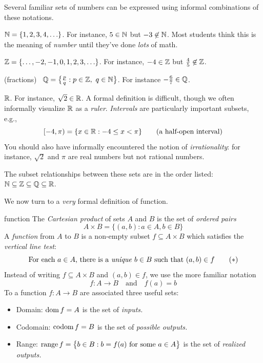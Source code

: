 Several familiar sets of numbers can be expressed using informal combinations of these notations.
\begin{description}\itemsep0pt
	\item[Natural numbers] $\mathbb{N}=\{1,2,3,4,\ldots\}$. For instance, $5\in\mathbb{N}$ but $-3\not\in\mathbb{N}$. Most students think this is the meaning of \emph{number} until they've done \emph{lots} of math.
	\item[Integers] $\mathbb{Z}=\{\ldots,-2,-1,0,1,2,3,\ldots\}$. For instance, $-4\in\mathbb{Z}$ but $\frac 45\not\in\mathbb{Z}$.
	\item[Rational numbers] (fractions) \ $\Q=\bigl\{\frac pq:p\in\Z,\ q\in\N\bigr\}$. For instance $-\frac 67\in\mathbb{Q}$. %
	\item[Real numbers] $\mathbb{R}$. For instance, $\sqrt 2\in\mathbb{R}$. A formal definition is difficult, though we often informally visualize $\mathbb{R}$ as a \emph{ruler}. \emph{Intervals} are particularly important subsets, e.g.,
	\[
		[-4,\pi)=\{x\in\mathbb{R}:-4\le x<\pi\} \tag{a half-open interval}
	\]
	You should also have informally encountered the notion of \emph{irrationality}: for instance, $\sqrt 2$ and $\pi$ are real numbers but not rational numbers.
\end{description}
The subset relationships between these sets are in the order listed: $\mathbb{N}\subseteq\mathbb{Z}\subseteq\mathbb{Q}\subseteq\mathbb{R}$.
\bigbreak

We now turn to a \emph{very} formal definition of function.

\begin{defn}{}{function}
	The \emph{Cartesian product} of sets $A$ and $B$ is the set of \emph{ordered pairs}
	\[
		A\times B=\big\{(a,b):a\in A,b\in B\big\}
	\]
	A \emph{function} from $A$ to $B$ is a non-empty subset $f\subseteq A\times B$ which satisfies the \emph{vertical line test}:
	\[
		\text{For each $a\in A$, there is a \emph{unique} $b\in B$ such that $(a,b)\in f$} \tag{$\ast$}
	\]
	Instead of writing $f\subseteq A\times B$ and $(a,b)\in f$, we use the more familiar notation
	\[
		f:A\to B\quad\text{and}\quad f(a)=b
	\]
	To a function $f:A\to B$ are associated three useful sets:
	\begin{itemize}
	  \item Domain: $\operatorname{dom} f=A$ is the set of \emph{inputs.}
	  \item Codomain: $\operatorname{codom} f=B$ is the set of \emph{possible outputs.}
	  \item Range: $\operatorname{range} f=\big\{b\in B:b=f(a)\text{ for some }a\in A\big\}$ is the set of \emph{realized outputs.}
	\end{itemize}
\end{defn}

